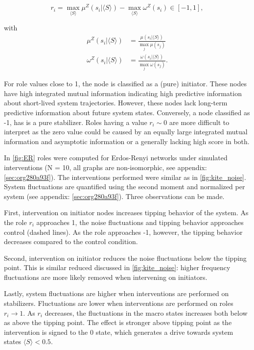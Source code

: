 \documentclass[a4paper, 11pt, twocolumn]{article}
\begin{document}
\begin{equation}
r_i  = \max_{\langle S \rangle}  \mu^Z(s_i | \langle S \rangle) - \max_{\langle S  \rangle} \omega^Z(s_i) \in  [-1, 1],
\end{equation}

with
\begin{equation}
\begin{aligned}
\mu^Z(s_i |  \langle S  \rangle) &=  \frac{\mu(s_i |  \langle S  \rangle )}{\max_j
\mu(s_j)}\\
\omega^Z(s_i | \langle S \rangle  ) &= \frac{\omega(s_i | \langle S \rangle)}{\max_j
\omega(s_j)}.
\end{aligned}
\end{equation}

For role  values close  to 1,  the node  is classified  as a
(pure) initiator.  These nodes  have high  integrated mutual
information  indicating  high predictive  information  about
short-lived system  trajectories. However, these  nodes lack
long-term predictive information about future system states.
Conversely,  a  node  classified  as   -1,  has  is  a  pure
stabilizer.  Roles  having  a  value  \(r_i  \sim  0\)  are  more
difficult to interpret as the  zero value could be caused by
an   equally  large   integrated   mutual  information   and
asymptotic information or a  generally lacking high score in
both.

In  \cref{fig:ER}   roles  were  computed   for  Erdos-Renyi
networks under  simulated interventions (N =  10, all graphs
are non-isomorphic,  see appendix:  \ref{sec:org280a93f}).
The   interventions    performed   were   similar    as   in
\cref{fig:kite_noise}.  System  fluctuations are  quantified
using  the  second moment  and  normalized  per system  (see
appendix: \ref{sec:org280a93f}). Three observations can be
made.

First,  intervention  on  initiator  nodes  increases
tipping behavior of the system. As the role \(r_i\) approaches
1, the  noise fluctuations  and tipping  behavior approaches
control (dashed lines). As  the role approaches -1, however,
the  tipping  behavior  decreases compared  to  the  control
condition.

Second,   intervention  on   initiator  reduces   the  noise
fluctuations  below  the  tipping  point.  This  is  similar
reduced discussed in \cref{fig:kite_noise}: higher frequency
fluctuations  are more  likely removed  when intervening  on
initiators.

Lastly,  system fluctuations  are higher  when interventions
are performed  on stabilizers.  Fluctuations are  lower when
interventions are  performed on  roles \(r_i  \to 1\).  As \(r_i\)
decreases, the  fluctuations in  the macro  states increases
both  below  as  above  the tipping  point.  The  effect  is
stronger above  tipping point as the  intervention is signed
to  the 0  state,  which generates  a  drive towards  system
states \(\langle S \rangle < 0.5\).
\end{document}
